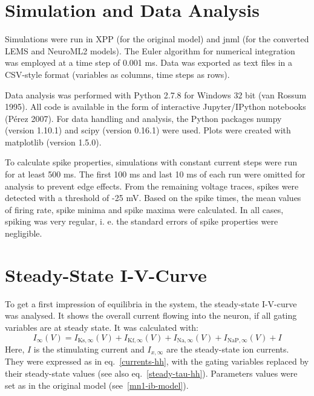 \documentclass[12pt,a4paper,]{report}
\begin{document}
\section{Simulation and Data
Analysis}\label{simulation-and-data-analysis}

Simulations were run in XPP (for the original model) and jnml (for the
converted LEMS and NeuroML2 models). The Euler algorithm for numerical
integration was employed at a time step of 0.001 ms. Data was exported
as text files in a CSV-style format (variables as columns, time steps as
rows).

Data analysis was performed with Python 2.7.8 for Windows 32 bit (van
Rossum 1995). All code is available in the form of interactive
Jupyter/IPython notebooks (Pérez 2007). For data handling and analysis,
the Python packages numpy (version 1.10.1) and scipy (version 0.16.1)
were used. Plots were created with matplotlib (version 1.5.0).

To calculate spike properties, simulations with constant current steps
were run for at least 500 ms. The first 100 ms and last 10 ms of each
run were omitted for analysis to prevent edge effects. From the
remaining voltage traces, spikes were detected with a threshold of -25
mV. Based on the spike times, the mean values of firing rate, spike
minima and spike maxima were calculated. In all cases, spiking was very
regular, i. e. the standard errors of spike properties were negligible.

\section{Steady-State I-V-Curve}\label{i-v-methods}

To get a first impression of equilibria in the system, the steady-state
I-V-curve was analysed. It shows the overall current flowing into the
neuron, if all gating variables are at steady state. It was calculated
with:
%
\begin{equation}
\label{i-inf}
I_{\infty}(V) = I_{\mathrm{Ks}, \infty}(V) + I_{\mathrm{Kf}, \infty}(V) + I_{\mathrm{Na}, \infty}(V) + I_{\mathrm{NaP}, \infty}(V) + I
\end{equation}
%
 Here, $I$ is the stimulating current and $I_{x, \infty}$ are the
steady-state ion currents. They were expressed as in
eq.~\ref{currents-hh}, with the gating variables replaced by their
steady-state values (see also eq.~\ref{steady-tau-hh}). Parameters
values were set as in the original model (see~\ref{mn1-ib-model}).
\end{document}
